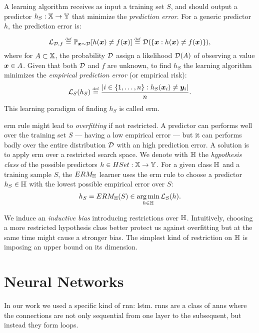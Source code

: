 A learning algorithm receives as input a training set $S$, and should
output a predictor $h_S:\mathbb{X}\rightarrow\mathbb{Y}$ that minimize the
\emph{prediction error}. For a generic predictor $h$, the prediction
error is:
\begin{equation*}
  \mathcal{L}_{\mathcal{D},f}\overset{\underset{\mathrm{def}}{}}{=}\mathbb{P}_{\bm{x}\sim\mathcal{D}}[h(\bm{x})\neq
  f(\bm{x})]\overset{\underset{\mathrm{def}}{}}{=}\mathcal{D}(\{\bm{x}:h(\bm{x})\neq
  f(\bm{x})\}),
\end{equation*}
where for $A\subset\mathbb{X}$, the probability $\mathcal{D}$ assign a
likelihood $\mathcal{D}(A)$ of observing a value $\bm{x}\in A$. Given
that both $\mathcal{D}$ and $f$ are unknown, to find $h_S$ the learning
algorithm minimizes the \emph{empirical prediction error} (or
empirical risk):
\begin{equation*}
  \mathcal{L}_S(h_S)\overset{\underset{\mathrm{def}}{}}{=}\frac{|i\in\{1,\dots,n\}:h_S(\bm{x}_i)\neq\bm{y}_i|}{n}.
\end{equation*}
This learning paradigm of finding $h_S$ is called \ac{erm}.

\ac{erm} rule might lead to \emph{overfitting} if not restricted. A predictor
can performs well over the training set $S$ --- having a low empirical
error --- but it can performs badly over the entire distribution
$\mathcal{D}$ with an high prediction error. A solution is to apply
\ac{erm} over a restricted search space. We denote with $\mathbb{H}$ the
\emph{hypothesis class} of the possible predictors
$h\in{HSet}:\mathbb{X}\rightarrow\mathbb{Y}$. For a given class $\mathbb{H}$ and a
training sample $S$, the $ERM_{\mathbb{H}}$ learner uses the \ac{erm} rule to
choose a predictor $h_S\in\mathbb{H}$ with the lowest possible empirical
error over $S$:
\begin{equation*}
  h_S=ERM_{\mathbb{H}}(S)\in \operatorname*{arg\,min}_{h\in\mathbb{H}} \mathcal{L}_S(h).
\end{equation*}

We induce an \emph{inductive bias} introducing restrictions over
$\mathbb{H}$. Intuitively, choosing a more restricted hypothesis class
better protect us against overfitting but at the same time might cause
a stronger bias. The simplest kind of restriction on $\mathbb{H}$ is
imposing an upper bound on its dimension.




\section{Neural Networks}
In our work we used a specific kind of \ac{rnn}: \ac{lstm}.
\acp{rnn} are a class of \acp{ann} where the connections are not only
sequential from one layer to the subsequent, but instead they form
loops. 

